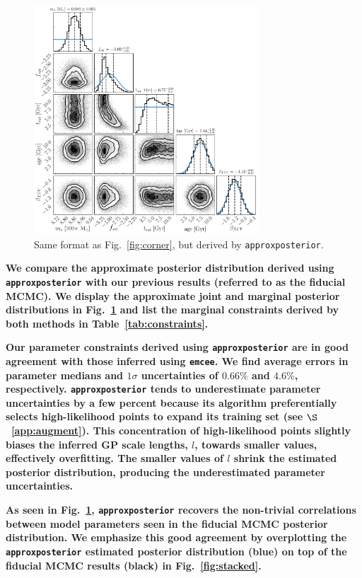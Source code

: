 \documentclass[twocolumn]{aastex62}
\newcommand{\xxx}[1]{{\textbf{#1}}}
\newcommand{\emcee}[0]{\texttt{emcee}\xspace}
\newcommand{\approxposterior}[0]{\texttt{approxposterior}\xspace}
\begin{document}
\begin{figure}[t]
\centering
	\includegraphics[width=0.75\textwidth]{../Analysis/Approx/apCorner.pdf}
   \caption{Same format as Fig.~\ref{fig:corner}, but derived by \approxposterior.}%
    \label{fig:approx}%
\end{figure}

\xxx{We compare the approximate posterior distribution derived using \approxposterior with our previous results (referred to as the fiducial MCMC). We display the approximate joint and \xxx{marginal} posterior distributions in Fig.~\ref{fig:approx} and list the \xxx{marginal} constraints derived by both methods in Table~\ref{tab:constraints}.} 

\xxx{Our parameter constraints derived using \approxposterior are in good agreement with those inferred using \emcee. We find average errors in parameter medians and $1\sigma$ uncertainties of $0.66\%$ and $4.6\%$, respectively. \approxposterior tends to underestimate parameter uncertainties by a few percent because its algorithm preferentially selects high-likelihood points to expand its training set (see $\S$~\ref{app:augment}). This concentration of high-likelihood points slightly biases the inferred GP scale lengths, $l$, towards smaller values, effectively overfitting. The smaller values of $l$ shrink the estimated posterior distribution, producing the underestimated parameter uncertainties.}

\xxx{As seen in Fig.~\ref{fig:approx}, \approxposterior recovers the non-trivial correlations between model parameters seen in the fiducial MCMC posterior distribution. We emphasize this good agreement by overplotting the \approxposterior estimated posterior distribution (blue) on top of the fiducial MCMC results (black) in Fig.~\ref{fig:stacked}.}
\end{document}
